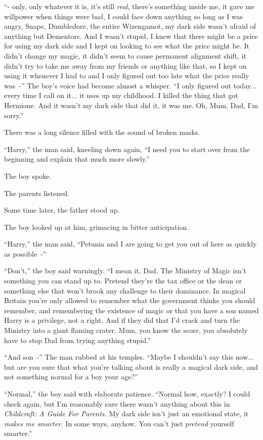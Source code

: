 ``- only, only whatever it is, it's still \emph{real,} there's something inside me, it gave me willpower when things were bad, I could face down anything so long as I was angry, Snape, Dumbledore, the entire Wizengamot, my dark side wasn't afraid of anything but Dementors. And I wasn't stupid, I knew that there might be a price for using my dark side and I kept on looking to see what the price might be. It didn't change my magic, it didn't seem to cause permanent alignment shift, it didn't try to take me away from my friends or anything like that, so I kept on using it whenever I had to and I only figured out too late what the price really was~-'' The boy's voice had become almost a whisper. ``I only figured out today... every time I call on it... it uses up my childhood. I killed the thing that got Hermione. And it wasn't my dark side that did it, it was me. Oh, Mum, Dad, I'm sorry.''

There was a long silence filled with the sound of broken masks.

``Harry,'' the man said, kneeling down again, ``I need you to start over from the beginning and explain that much more slowly.''

The boy spoke.

The parents listened.

Some time later, the father stood up.

The boy looked up at him, grimacing in bitter anticipation.

``Harry,'' the man said, ``Petunia and I are going to get you out of here as quickly as possible~-''

``Don't,'' the boy said warningly. ``I mean it, Dad. The Ministry of Magic isn't something you can stand up to. Pretend they're the tax office or the dean or something else that won't brook any challenge to their dominance. In magical Britain you're only allowed to remember what the government thinks you should remember, and remembering the existence of magic or that you have a son named Harry is a privilege, not a right. And if they did that I'd crack and turn the Ministry into a giant flaming crater. Mum, you know the score, you absolutely have to stop Dad from trying anything stupid.''

``And son~-'' The man rubbed at his temples. ``Maybe I shouldn't say this now... but are you sure that what you're talking about is really a magical dark side, and not something normal for a boy your age?''

``Normal,'' the boy said with elaborate patience. ``Normal how, exactly? I could check again, but I'm reasonably sure there wasn't anything about this in \emph{Childcraft: A Guide For Parents.} My dark side isn't just an emotional state, it \emph{makes me smarter.} In some ways, anyhow. You can't just \emph{pretend} yourself smarter.''

